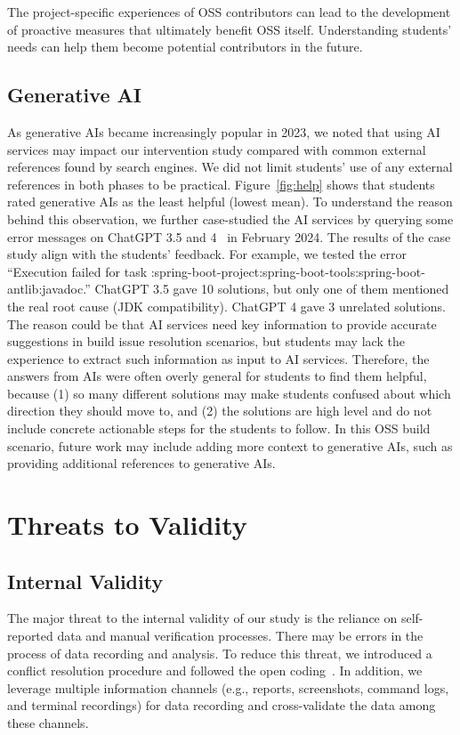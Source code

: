 \documentclass[10pt, conference]{IEEEtran}
\begin{document}
The project-specific experiences of OSS contributors can lead to the development of proactive measures that ultimately benefit OSS itself. Understanding students’ needs can help them become potential contributors in the future.

\subsection{Generative AI}
As generative AIs became increasingly popular in 2023, we noted that using AI services may impact our intervention study compared with common external references found by search engines. We did not limit students’ use of any external references in both phases to be practical. Figure~\ref{fig:help} shows that students rated generative AIs as the least helpful (lowest mean). To understand the reason behind this observation, we further case-studied the AI services by querying some error messages on ChatGPT 3.5 and 4~\cite{openai2024chatgpt} in February 2024. The results of the case study align with the students’ feedback. For example, we tested the error ``Execution failed for task :spring-boot-project:spring-boot-tools:spring-boot-antlib:javadoc.'' ChatGPT 3.5 gave 10 solutions, but only one of them mentioned the real root cause (JDK compatibility). ChatGPT 4 gave 3 unrelated solutions. The reason could be that AI services need key information to provide accurate suggestions in build issue resolution scenarios, but students may lack the experience to extract such information as input to AI services. Therefore, the answers from AIs were often overly general for students to find them helpful, because (1) so many different solutions may make students confused about which direction they should move to, and (2) the solutions are high level and do not include concrete actionable steps for the students to follow. In this OSS build scenario, future work may include adding more context to generative AIs, such as providing additional references to generative AIs.
\section{Threats to Validity}
\subsection{Internal Validity}
The major threat to the internal validity of our study is the reliance on self-reported data and manual verification processes. There may be errors in the process of data recording and analysis. To reduce this threat, we introduced a conflict resolution procedure and followed the open coding~\cite{Seaman_1999}. In addition, we leverage multiple information channels (e.g., reports, screenshots, command logs, and terminal recordings) for data recording and cross-validate the data among these channels.
\end{document}
